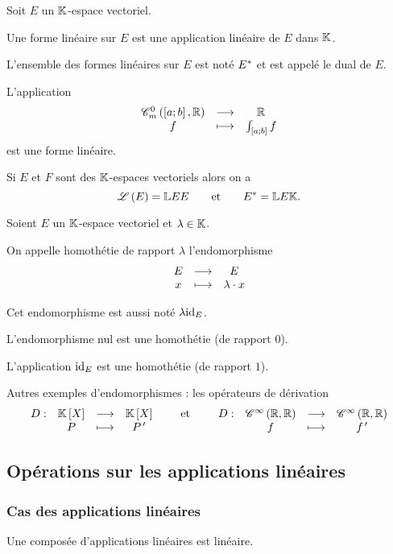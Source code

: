 \begin{defi}
Soit \(E\) un \(\mathbb{K}\)-espace vectoriel.

Une forme linéaire sur \(E\) est une application linéaire de \(E\) dans \(\mathbb{K}\).

L'ensemble des formes linéaires sur \(E\) est noté \(E^{*}\) et est appelé le dual de \(E\).
\end{defi}

\begin{ex}
L'application \[\fonctionlambda{\contm[\intervii{a}{b}][\R]}{\R}{f}{\int_{\intervii{a}{b}}f}\] est une forme linéaire.
\end{ex}

\begin{rem}
Si \(E\) et \(F\) sont des \(\mathbb{K}\)-espaces vectoriels alors on a \[\mathscr{L}\left(E\right)=\mathbb{L}{E}{E}\qquad\text{et}\qquad E^{*}=\mathbb{L}{E}{\mathbb{K}}.\]
\end{rem}

\begin{ex}[Homothéties]
Soient \(E\) un \(\mathbb{K}\)-espace vectoriel et \(\lambda\in\mathbb{K}\).

On appelle homothétie de rapport \(\lambda\) l'endomorphisme \[\begin{array}[t]{ccc}E & \longrightarrow & E \\ x & \longmapsto & \lambda\cdot x\end{array}\]

Cet endomorphisme est aussi noté \(\lambda\mathrm{id}_{E}\).

L'endomorphisme nul est une homothétie (de rapport \(0\)).

L'application \(\mathrm{id}_{E}\) est une homothétie (de rapport \(1\)).
\end{ex}

\begin{ex}
Autres exemples d'endomorphismes : les opérateurs de dérivation \[\fonction{D}{\poly}{\poly}{P}{P\prim}\qquad\text{et}\qquad\fonction{D}{\ensclasse{\infty}{\R}{\R}}{\ensclasse{\infty}{\R}{\R}}{f}{f\prim}\]
\end{ex}

\subsection{Opérations sur les applications linéaires}

\subsubsection{Cas des applications linéaires}

\begin{prop}
Une composée d'applications linéaires est linéaire.
\end{prop}

